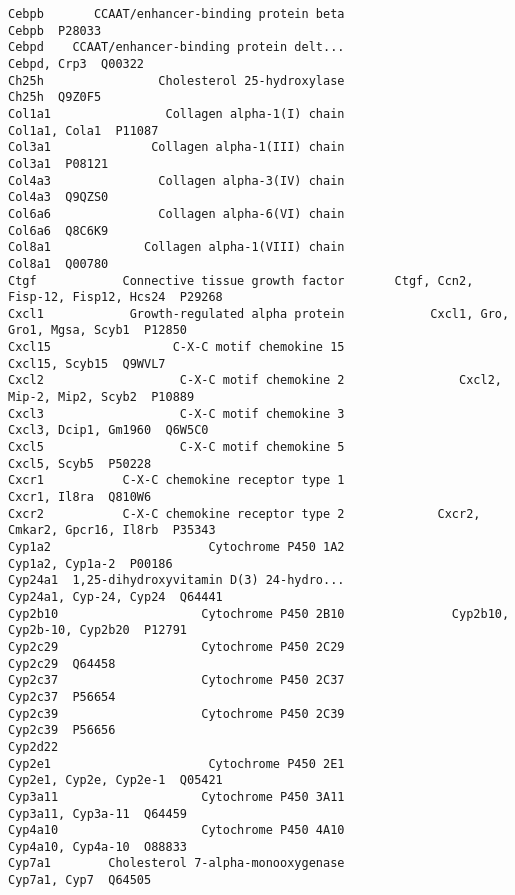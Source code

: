 \documentclass[]{article}
\begin{document}
\begin{verbatim}
Cebpb       CCAAT/enhancer-binding protein beta                                    Cebpb  P28033
Cebpd    CCAAT/enhancer-binding protein delt...                              Cebpd, Crp3  Q00322
Ch25h                Cholesterol 25-hydroxylase                                    Ch25h  Q9Z0F5
Col1a1                Collagen alpha-1(I) chain                            Col1a1, Cola1  P11087
Col3a1              Collagen alpha-1(III) chain                                   Col3a1  P08121
Col4a3               Collagen alpha-3(IV) chain                                   Col4a3  Q9QZS0
Col6a6               Collagen alpha-6(VI) chain                                   Col6a6  Q8C6K9
Col8a1             Collagen alpha-1(VIII) chain                                   Col8a1  Q00780
Ctgf            Connective tissue growth factor       Ctgf, Ccn2, Fisp-12, Fisp12, Hcs24  P29268
Cxcl1            Growth-regulated alpha protein            Cxcl1, Gro, Gro1, Mgsa, Scyb1  P12850
Cxcl15                 C-X-C motif chemokine 15                           Cxcl15, Scyb15  Q9WVL7
Cxcl2                   C-X-C motif chemokine 2                Cxcl2, Mip-2, Mip2, Scyb2  P10889
Cxcl3                   C-X-C motif chemokine 3                     Cxcl3, Dcip1, Gm1960  Q6W5C0
Cxcl5                   C-X-C motif chemokine 5                             Cxcl5, Scyb5  P50228
Cxcr1           C-X-C chemokine receptor type 1                             Cxcr1, Il8ra  Q810W6
Cxcr2           C-X-C chemokine receptor type 2             Cxcr2, Cmkar2, Gpcr16, Il8rb  P35343
Cyp1a2                      Cytochrome P450 1A2                          Cyp1a2, Cyp1a-2  P00186
Cyp24a1  1,25-dihydroxyvitamin D(3) 24-hydro...                   Cyp24a1, Cyp-24, Cyp24  Q64441
Cyp2b10                    Cytochrome P450 2B10               Cyp2b10, Cyp2b-10, Cyp2b20  P12791
Cyp2c29                    Cytochrome P450 2C29                                  Cyp2c29  Q64458
Cyp2c37                    Cytochrome P450 2C37                                  Cyp2c37  P56654
Cyp2c39                    Cytochrome P450 2C39                                  Cyp2c39  P56656
Cyp2d22                                                                                         
Cyp2e1                      Cytochrome P450 2E1                   Cyp2e1, Cyp2e, Cyp2e-1  Q05421
Cyp3a11                    Cytochrome P450 3A11                        Cyp3a11, Cyp3a-11  Q64459
Cyp4a10                    Cytochrome P450 4A10                        Cyp4a10, Cyp4a-10  O88833
Cyp7a1        Cholesterol 7-alpha-monooxygenase                             Cyp7a1, Cyp7  Q64505

\end{verbatim}
\end{document}
